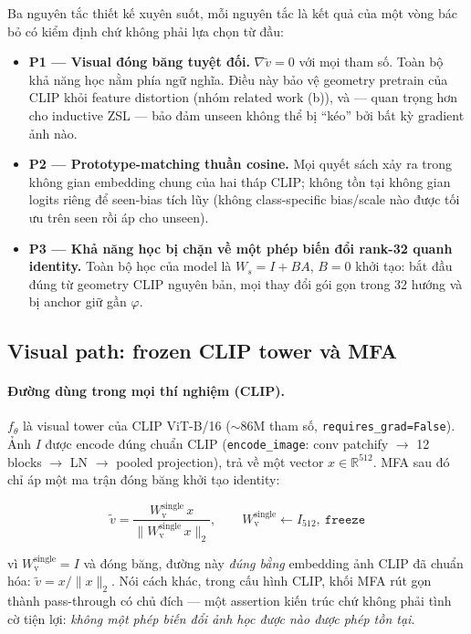 \documentclass[10pt,twocolumn,letterpaper]{article}
\newcommand{\R}{\mathbb{R}}
\newcommand{\vtilde}{\tilde{v}}
\begin{document}
Ba nguyên tắc thiết kế xuyên suốt, mỗi nguyên tắc là kết quả của một vòng bác bỏ có kiểm định chứ không phải lựa chọn từ đầu:

\begin{itemize}
\item \textbf{P1 — Visual đóng băng tuyệt đối.} $\nabla \vtilde = 0$ với mọi tham số. Toàn bộ khả năng học nằm phía ngữ nghĩa. Điều này bảo vệ geometry pretrain của CLIP khỏi feature distortion (nhóm related work (b)), và — quan trọng hơn cho inductive ZSL — bảo đảm unseen không thể bị ``kéo'' bởi bất kỳ gradient ảnh nào.
\item \textbf{P2 — Prototype-matching thuần cosine.} Mọi quyết sách xảy ra trong không gian embedding chung của hai tháp CLIP; không tồn tại không gian logits riêng để seen-bias tích lũy (không class-specific bias/scale nào được tối ưu trên seen rồi áp cho unseen).
\item \textbf{P3 — Khả năng học bị chặn về một phép biến đổi rank-32 quanh identity.} Toàn bộ học của model là $W_s = I + BA$, $B{=}0$ khởi tạo: bắt đầu đúng từ geometry CLIP nguyên bản, mọi thay đổi gói gọn trong 32 hướng và bị anchor giữ gần $\varphi$.
\end{itemize}

\subsection{Visual path: frozen CLIP tower và MFA}
\label{sec:vision}

\paragraph{Đường dùng trong mọi thí nghiệm (CLIP).}
$f_\theta$ là visual tower của CLIP ViT-B/16 (${\sim}86$M tham số, \texttt{requires\_grad=False}). Ảnh $I$ được encode đúng chuẩn CLIP (\texttt{encode\_image}: conv patchify $\to$ 12 blocks $\to$ LN $\to$ pooled projection), trả về một vector $x\in\R^{512}$. MFA sau đó chỉ áp một ma trận đóng băng khởi tạo identity:

\begin{equation}
\vtilde = \frac{W_{\mathrm{v}}^{\text{single}}\,x}{\|W_{\mathrm{v}}^{\text{single}}\,x\|_2},
\qquad
W_{\mathrm{v}}^{\text{single}} \leftarrow I_{512},\ \texttt{freeze}
\label{eq:mfa-clip}
\end{equation}

vì $W_{\mathrm{v}}^{\text{single}} = I$ và đóng băng, đường này \emph{đúng bằng} embedding ảnh CLIP đã chuẩn hóa:
$\vtilde = x/\|x\|_2$. Nói cách khác, trong cấu hình CLIP, khối MFA rút gọn thành pass-through có chủ đích — một assertion kiến trúc chứ không phải tình cờ tiện lợi: \emph{không một phép biến đổi ảnh học được nào được phép tồn tại}.
\end{document}
